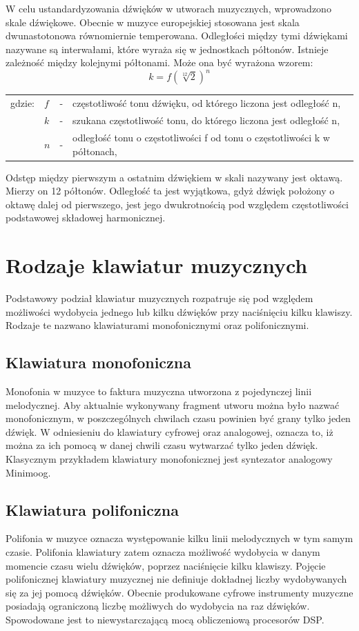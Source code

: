 W celu ustandardyzowania dźwięków w utworach muzycznych, wprowadzono skale dźwiękowe. Obecnie w muzyce europejskiej stosowana jest skala dwunastotonowa równomiernie temperowana. Odległości między tymi dźwiękami nazywane są interwałami, które wyraża się w jednostkach półtonów. Istnieje zależność między kolejnymi półtonami. Może ona być wyrażona wzorem:
\begin{equation} \label{equ:idft}
k = f(\sqrt[12]{2})^{n}
\end{equation}
\begin{tabular}{ l l l l}
	gdzie: 	&	$f$ & - &  częstotliwość tonu dźwięku, od którego liczona jest odległość n, \\
	&	$k$ & - &  szukana częstotliwość tonu, do którego liczona jest odległość n, \\
	&   $n$ &  - & odległość tonu o częstotliwości f od tonu o częstotliwości k w półtonach, \\
\end{tabular}

Odstęp między pierwszym a ostatnim dźwiękiem w skali nazywany jest oktawą. Mierzy on 12 półtonów. Odległość ta jest wyjątkowa, gdyż dźwięk położony o oktawę dalej od pierwszego, jest jego dwukrotnością pod względem częstotliwości podstawowej składowej harmonicznej.



\section{Rodzaje klawiatur muzycznych}
Podstawowy podział klawiatur muzycznych rozpatruje się pod względem możliwości wydobycia jednego lub kilku dźwięków przy naciśnięciu kilku klawiszy. Rodzaje te nazwano klawiaturami monofonicznymi oraz polifonicznymi.

\subsection{Klawiatura monofoniczna}
Monofonia w muzyce to faktura muzyczna utworzona z pojedynczej linii melodycznej. Aby aktualnie wykonywany fragment utworu można było nazwać monofonicznym, w poszczególnych chwilach czasu powinien być grany tylko jeden dźwięk. W odniesieniu do klawiatury cyfrowej oraz analogowej, oznacza to, iż można za ich pomocą w danej chwili czasu wytwarzać tylko jeden dźwięk. Klasycznym przykładem klawiatury monofonicznej jest syntezator analogowy Minimoog.

\subsection{Klawiatura polifoniczna}
Polifonia w muzyce oznacza występowanie kilku linii melodycznych w tym samym czasie. Polifonia klawiatury zatem oznacza możliwość wydobycia w danym momencie czasu wielu dźwięków, poprzez naciśnięcie kilku klawiszy. Pojęcie polifonicznej klawiatury muzycznej nie definiuje dokładnej liczby wydobywanych się za jej pomocą dźwięków. Obecnie produkowane cyfrowe instrumenty muzyczne posiadają ograniczoną liczbę możliwych do wydobycia na raz dźwięków. Spowodowane jest to niewystarczającą mocą obliczeniową procesorów DSP.

